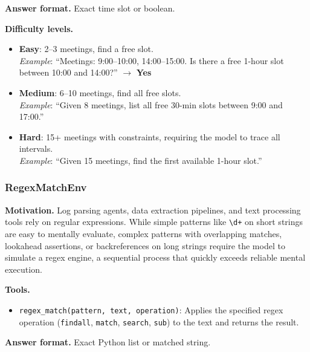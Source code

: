 \textbf{Answer format.} Exact time slot or boolean.

\textbf{Difficulty levels.}
\begin{itemize}
    \item \textbf{Easy}: 2--3 meetings, find a free slot.\\
    \emph{Example}: ``Meetings: 9:00--10:00, 14:00--15:00. Is there a free 1-hour slot between 10:00 and 14:00?'' $\to$ \textbf{Yes}
    \item \textbf{Medium}: 6--10 meetings, find all free slots.\\
    \emph{Example}: ``Given 8 meetings, list all free 30-min slots between 9:00 and 17:00.''
    \item \textbf{Hard}: 15+ meetings with constraints, requiring the model to trace all intervals.\\
    \emph{Example}: ``Given 15 meetings, find the first available 1-hour slot.''
\end{itemize}

\subsubsection{RegexMatchEnv}

\textbf{Motivation.}
Log parsing agents, data extraction pipelines, and text processing tools rely on regular expressions. While simple patterns like \texttt{\textbackslash d+} on short strings are easy to mentally evaluate, complex patterns with overlapping matches, lookahead assertions, or backreferences on long strings require the model to simulate a regex engine, a sequential process that quickly exceeds reliable mental execution.

\textbf{Tools.}
\begin{itemize}
    \item \texttt{regex\_match(pattern, text, operation)}: Applies the specified regex operation (\texttt{findall}, \texttt{match}, \texttt{search}, \texttt{sub}) to the text and returns the result.
\end{itemize}

\textbf{Answer format.} Exact Python list or matched string.

